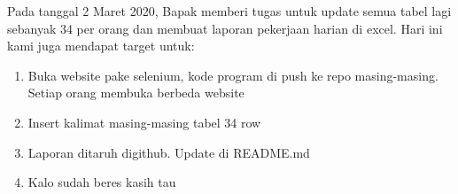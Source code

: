 \documentclass[a4paper, 12 pt]{article}
\newcounter{saveenumi}
\newcommand{\seti}{\setcounter{saveenumi}{\value{enumi}}} %
\begin{document}
            \newpage
            \par Pada tanggal 2 Maret 2020, Bapak memberi tugas untuk update semua tabel lagi sebanyak 34 per orang dan membuat laporan pekerjaan harian di excel. Hari ini kami juga mendapat target untuk:
		        \begin{enumerate}
                    \item Buka website pake selenium, kode program di push ke repo masing-masing. Setiap orang membuka berbeda website
                    \item Insert kalimat masing-masing tabel 34 row
                    \item Laporan ditaruh digithub. Update di README.md
                    \item Kalo sudah beres kasih tau
                    \seti %
                \end{enumerate}
\end{document}
